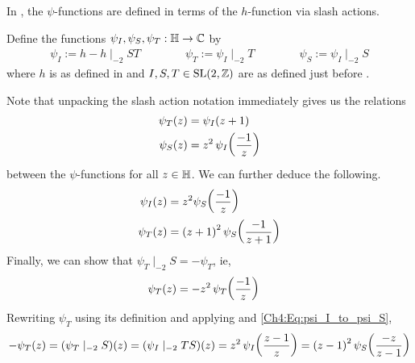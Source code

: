 In \cite{Viazovska8}, the $\psi$-functions are defined in terms of the $h$-function via slash actions.

\begin{boxdefinition}\label{Ch4:Def:psis_in_terms_of_h}
    Define the functions $\psi_I, \psi_S, \psi_T : \mathbb{H} \to \mathbb{C}$ by
    \begin{align*}
        \psi_I := h - h\mid_{-2} ST
        \qquad\qquad
        \psi_T := \psi_I \mid_{-2} T
        \qquad\qquad
        \psi_S := \psi_I \mid_{-2} S
    \end{align*}
    where $h$ is as defined in  and $I, S, T \in \operatorname{SL}\!\left( 2, \mathbb{Z} \right)$ are as defined just before .
\end{boxdefinition}

Note that unpacking the slash action notation immediately gives us the relations
\begin{align}
    \psi_T(z) &= \psi_I\!\left( z + 1 \right) \label{Ch4:Eq:psi_T_eq_psi_I_add_one} \\
    \psi_S(z) &= z^2 \, \psi_I\!\left( \frac{-1}{z} \right) \label{Ch4:Eq:psi_S_eq_zsq_mul_psi_I_neg_inv}
\end{align}
between the $\psi$-functions for all $z \in \mathbb{H}$. We can further deduce the following.
    \begin{align}
        \psi_I(z) &= z^2 \psi_S\!\left( \frac{-1}{z} \right) \label{Ch4:Eq:psi_I_to_psi_S} \\
        \psi_T(z) &= \left( z+1 \right)^2 \psi_S\!\left( \frac{-1}{z+1} \right) \label{Ch4:Eq:psi_T_to_psi_S_add}
    \end{align}
Finally, we can show \cite[p.1006]{Viazovska8} that $\psi_T \mid_{-2} S = -\psi_T$, ie,
\begin{align}
    \psi_T(z) &= -z^2 \, \psi_T\!\left( \frac{-1}{z} \right) \label{Ch4:Eq:psi_T_eq_zsq_mul_psi_T_neg_inv}
\end{align}
Rewriting $\psi_T$ using its definition and applying  and \eqref{Ch4:Eq:psi_I_to_psi_S},
\begin{align}
    -\psi_T(z)
    = \left( \psi_T \mid_{-2} S \right)\!\left( z \right)
    = \left( \psi_I \mid_{-2} TS \right)\!\left( z \right)
    = z^2 \, \psi_I\!\left( \frac{z - 1}{z} \right)
    = \left( z-1 \right)^2 \psi_S\!\left( \frac{-z}{z - 1} \right)
    \label{Ch4:Eq:psi_T_to_psi_S_sub}
\end{align}


